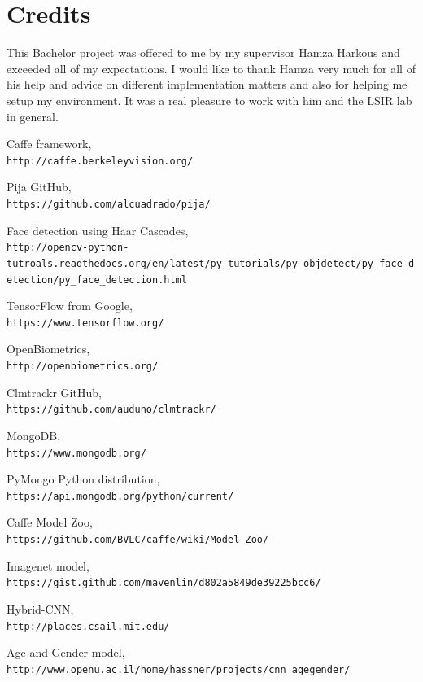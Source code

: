 \documentclass{article}
\begin{document}
\section{Credits}
This Bachelor project was offered to me by my supervisor Hamza Harkous and exceeded all of my expectations. I would like to thank Hamza very much for all of his help and advice on different implementation matters and also for helping me setup my environment. It was a real pleasure to work with him and the LSIR lab in general.
\newpage
\begin{thebibliography}{23}
Caffe framework,
\\\texttt{http://caffe.berkeleyvision.org/}
 
Pija GitHub,
\\\texttt{https://github.com/alcuadrado/pija/}
 
Face detection using Haar Cascades,
\\\texttt{http://opencv-python-tutroals.readthedocs.org/en/latest/py\_tutorials/py\_objdetect/py\_face\_detection/py\_face\_detection.html}

TensorFlow from Google,
\\\texttt{https://www.tensorflow.org/}

OpenBiometrics,
\\\texttt{http://openbiometrics.org/}

Clmtrackr GitHub,
\\\texttt{https://github.com/auduno/clmtrackr/}

MongoDB,
\\\texttt{https://www.mongodb.org/}

PyMongo Python distribution,
\\\texttt{https://api.mongodb.org/python/current/}

Caffe Model Zoo,
\\\texttt{https://github.com/BVLC/caffe/wiki/Model-Zoo/}

Imagenet model,
\\\texttt{https://gist.github.com/mavenlin/d802a5849de39225bcc6/}

Hybrid-CNN,
\\\texttt{http://places.csail.mit.edu/}

Age and Gender model,
\\\texttt{http://www.openu.ac.il/home/hassner/projects/cnn\_agegender/}


\end{thebibliography}
\end{document}
